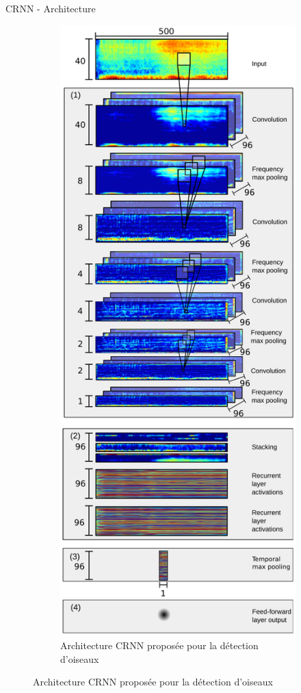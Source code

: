 \documentclass[compress,xcolor=table]{beamer}
\begin{document}
\begin{frame}{CRNN - Architecture}
\begin{figure}[ht]
\begin{subfigure}[b]{0.45\textwidth}
            \label{fig:CRNN.architecture.generic}
        \end{subfigure}
        \hfill
        \begin{subfigure}[b]{0.45\textwidth}
            \centering
            \includegraphics[width=\textwidth,height=0.8\textheight,keepaspectratio]{../images/models/CRNN.architecture.birds.pdf}
            \caption{Architecture CRNN proposée pour la détection d'oiseaux}
            \label{fig:CRNN.architecture.birds}
        \end{subfigure}
    \end{figure}

\end{frame}
\end{document}
